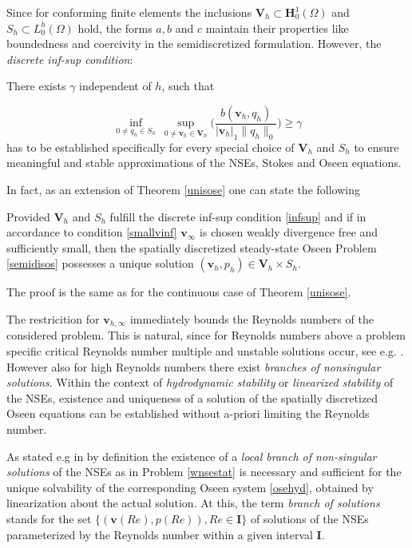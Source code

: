 \documentclass[a4paper,10pt,BCOR=15mm]{scrbook}
\providecommand{\abs}[1]{\lvert#1\rvert}
\providecommand{\norm}[1]{\lVert#1 \rVert}
\begin{document}
Since for conforming finite elements the inclusions $\mathbf V_h \subset \mathbf H_0^1(\Omega)$ and $S_h \subset L_0^h (\Omega)$ hold, the forms $a,b$ and $c$ maintain their properties like boundedness and coercivity in the semidiscretized formulation. However, the \textit{discrete inf-sup condition}:

There exists $\gamma$ independent of $h$, such that

\begin{equation}\label{infsup}
\inf_{0 \neq q_h \in S_h} ~ \sup_{0 \neq \mathbf v_h \in \mathbf V_h} \biggl ( \frac{b(\mathbf v_h, q_h)}{\abs{\mathbf v_h}_1 \norm{q_h}_0} \biggr ) \geq \gamma
\end{equation}
has to be established specifically for every special choice of $\mathbf V_h$ and $S_h$ to ensure meaningful and stable approximations of the NSEs, Stokes and Oseen equations.

In fact, as an extension of Theorem \ref{unisose} one can state the following

\begin{cor}\label{unisolsemos}
 Provided $\mathbf V_h$ and $S_h$ fulfill the discrete inf-sup condition \eqref{infsup} and if in accordance to condition \eqref{smallvinf} $\mathbf v_{\infty}$ is chosen weakly divergence free and sufficiently small, then the spatially discretized steady-state Oseen Problem \ref{semidisos} possesses a unique solution $(\mathbf v_h,p_h) \in \mathbf V_h \times S_h$.
\end{cor}

The proof is the same as for the continuous case of Theorem \ref{unisose}.

The restricition for $\mathbf v_{h,\infty}$ immediately bounds the Reynolds numbers of the considered problem. This is natural, since for Reynolds numbers above a problem specific critical Reynolds number multiple and unstable solutions occur, see e.g. \cite[Ch. 8]{loj}. However also for high Reynolds numbers there exist \textit{branches of nonsingular solutions}. Within the context of \textit{hydrodynamic stability} or \textit{linearized stability} of the NSEs, existence and uniqueness of a solution of the spatially discretized Oseen equations can be established without a-priori limiting the Reynolds number.

As stated e.g in \cite[p.~14]{gunz} by definition the existence of a \textit{local branch of non-singular solutions} of the NSEs as in Problem \ref{wnsestat} is necessary and sufficient for the unique solvability of the corresponding Oseen system \eqref{osehyd}, obtained by linearization about the actual solution. At this, the term \textit{branch of solutions} stands for the set $\{ (\mathbf v(Re),p(Re)), Re \in \mathbf I\}$ of solutions of the NSEs parameterized by the Reynolds number within a given interval $\mathbf I$. 
\end{document}

